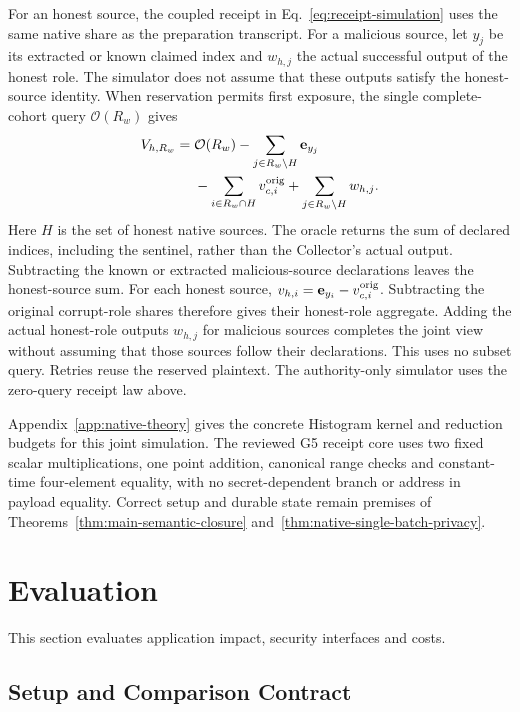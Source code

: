 \documentclass[conference,compsoc]{IEEEtran}
\theoremstyle{definition}
\numberwithin{equation}{section}
\numberwithin{table}{section}
\numberwithin{figure}{section}
\theoremstyle{plain}
\begin{document}
For an honest source, the coupled receipt in Eq.~\eqref{eq:receipt-simulation}
uses the same native share as the preparation transcript. For a malicious
source, let \(y_j\) be its extracted or known claimed index and \(w_{h,j}\)
the actual successful output of the honest role. The simulator does not assume
that these outputs satisfy the honest-source identity. When reservation permits
first exposure, the single complete-cohort query \(\mathcal O(R_w)\) gives
\begin{equation}
\begin{split}
 V_{h,R_w}={}&\mathcal O(R_w)-\sum_{j\in R_w\setminus H}\mathbf e_{y_j}\\
 &-\sum_{i\in R_w\cap H}v_{c,i}^{\rm orig}
 +\sum_{j\in R_w\setminus H}w_{h,j}.
\end{split}
\label{eq:simulated-honest-export}
\end{equation}
Here \(H\) is the set of honest native sources. The oracle returns the sum of
declared indices, including the sentinel, rather than the Collector's actual
output. Subtracting the known or extracted malicious-source declarations
leaves the honest-source sum. For each honest source,
\(v_{h,i}=\mathbf e_{y_i}-v_{c,i}^{\rm orig}\). Subtracting the original
corrupt-role shares therefore gives their honest-role aggregate. Adding the
actual honest-role outputs \(w_{h,j}\) for malicious sources completes the
joint view without assuming that those sources follow their declarations.
This uses no subset query. Retries reuse the reserved plaintext. The authority-only simulator uses the zero-query receipt law above.

Appendix~\ref{app:native-theory} gives the concrete Histogram kernel and
reduction budgets for this joint simulation. The reviewed G5
receipt core uses two fixed scalar multiplications, one point addition,
canonical range checks and constant-time four-element equality, with no
secret-dependent branch or address in payload equality. Correct setup and
durable state remain premises of Theorems~\ref{thm:main-semantic-closure} and~\ref{thm:native-single-batch-privacy}.


\section{Evaluation}
\label{sec:evaluation}

This section evaluates application impact, security interfaces and costs.

\subsection{Setup and Comparison Contract}
\label{sec:eval-setup-summary}
\end{document}
